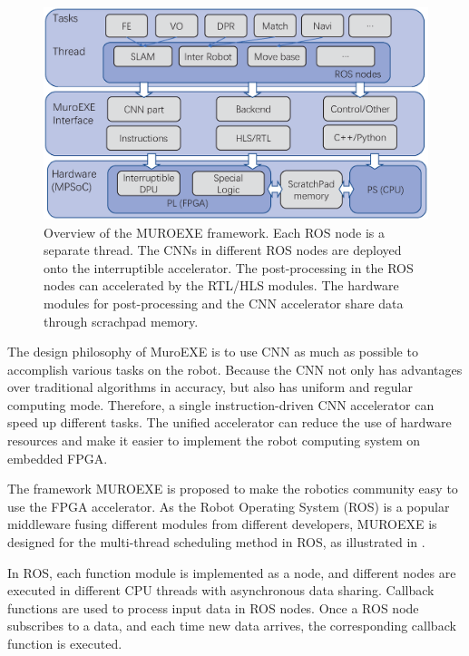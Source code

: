 \label{sec:muroexe}


\begin{figure}[t]
	\centering
    \includegraphics[width=0.99\linewidth]{fig/muroexe.eps}
    \caption{ Overview of the MUROEXE framework. Each ROS node is a separate thread. The CNNs in different ROS nodes are deployed onto the interruptible accelerator. The post-processing in the ROS nodes can accelerated by the RTL/HLS modules. The hardware modules for post-processing and the CNN accelerator share data through scrachpad memory. }
	\label{fig:muroexe}
\end{figure}

The design philosophy of MuroEXE is to use CNN as much as possible to accomplish various tasks on the robot. Because the CNN not only has advantages over traditional algorithms in accuracy, but also has uniform and regular computing mode. Therefore, a single instruction-driven CNN accelerator can speed up different tasks. The unified accelerator can reduce the use of hardware resources and make it easier to implement the robot computing system on embedded FPGA.

The framework MUROEXE is proposed to make the robotics community easy to use the FPGA accelerator. As the Robot Operating System (ROS) \cite{quigley2009ros} is a popular middleware fusing different modules from different developers, MUROEXE is designed for the multi-thread scheduling method in ROS, as illustrated in .

In ROS, each function module is implemented as a node, and different nodes are executed in different CPU threads with asynchronous data sharing. Callback functions are used to process input data in ROS nodes. Once a ROS node subscribes to a data, and each time new data arrives, the corresponding callback function is executed.

